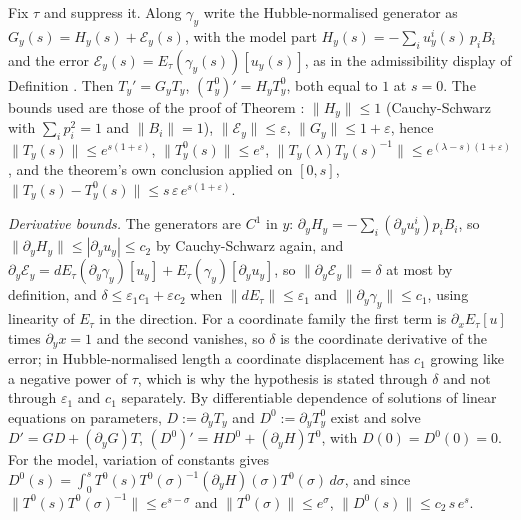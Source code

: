Fix $\tau$ and suppress it. Along $\gamma_{y}$ write the Hubble-normalised generator as $G_{y}(s) = H_{y}(s) + \mathcal{E}_{y}(s)$, with the model part $H_{y}(s) = -\sum_{i}u^{i}_{y}(s)\,p_{i}B_{i}$ and the error $\mathcal{E}_{y}(s) = E_{\tau}(\gamma_{y}(s))[u_{y}(s)]$, as in the admissibility display of Definition . Then $T_{y}' = G_{y}T_{y}$, $(T^{0}_{y})' = H_{y}T^{0}_{y}$, both equal to $1$ at $s = 0$. The bounds used are those of the proof of Theorem : $\|H_{y}\| \le 1$ (Cauchy-Schwarz with $\sum_{i}p_{i}^{2} = 1$ and $\|B_{i}\| = 1$), $\|\mathcal{E}_{y}\| \le \varepsilon$, $\|G_{y}\| \le 1 + \varepsilon$, hence $\|T_{y}(s)\| \le e^{s(1+\varepsilon)}$, $\|T^{0}_{y}(s)\| \le e^{s}$, $\|T_{y}(\lambda)T_{y}(s)^{-1}\| \le e^{(\lambda - s)(1 + \varepsilon)}$, and the theorem's own conclusion applied on $[0, s]$, $\|T_{y}(s) - T^{0}_{y}(s)\| \le s\,\varepsilon\,e^{s(1+\varepsilon)}$.

\emph{Derivative bounds.} The generators are $C^{1}$ in $y$: $\partial_{y}H_{y} = -\sum_{i}(\partial_{y}u^{i}_{y})p_{i}B_{i}$, so $\|\partial_{y}H_{y}\| \le |\partial_{y}u_{y}| \le c_{2}$ by Cauchy-Schwarz again, and $\partial_{y}\mathcal{E}_{y} = dE_{\tau}(\partial_{y}\gamma_{y})[u_{y}] + E_{\tau}(\gamma_{y})[\partial_{y}u_{y}]$, so $\|\partial_{y}\mathcal{E}_{y}\| = \delta$ at most by definition, and $\delta \le \varepsilon_{1}c_{1} + \varepsilon c_{2}$ when $\|dE_{\tau}\| \le \varepsilon_{1}$ and $\|\partial_{y}\gamma_{y}\| \le c_{1}$, using linearity of $E_{\tau}$ in the direction. For a coordinate family the first term is $\partial_{x}E_{\tau}[u]$ times $\partial_{y}x = 1$ and the second vanishes, so $\delta$ is the coordinate derivative of the error; in Hubble-normalised length a coordinate displacement has $c_{1}$ growing like a negative power of $\tau$, which is why the hypothesis is stated through $\delta$ and not through $\varepsilon_{1}$ and $c_{1}$ separately. By differentiable dependence of solutions of linear equations on parameters, $D := \partial_{y}T_{y}$ and $D^{0} := \partial_{y}T^{0}_{y}$ exist and solve $D' = GD + (\partial_{y}G)T$, $(D^{0})' = HD^{0} + (\partial_{y}H)T^{0}$, with $D(0) = D^{0}(0) = 0$. For the model, variation of constants gives $D^{0}(s) = \int_{0}^{s}T^{0}(s)T^{0}(\sigma)^{-1}(\partial_{y}H)(\sigma)T^{0}(\sigma)\,d\sigma$, and since $\|T^{0}(s)T^{0}(\sigma)^{-1}\| \le e^{s - \sigma}$ and $\|T^{0}(\sigma)\| \le e^{\sigma}$, $\|D^{0}(s)\| \le c_{2}\,s\,e^{s}$.

